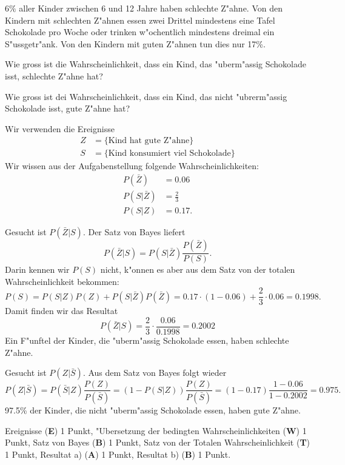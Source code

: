$6\%$ aller Kinder zwischen 6 und 12 Jahre haben schlechte Z"ahne.
Von den Kindern mit schlechten Z"ahnen essen zwei Drittel mindestens eine
Tafel Schokolade pro Woche oder trinken w"ochentlich mindestens
dreimal ein S"ussgetr"ank. Von den Kindern mit guten Z"ahnen tun dies
nur 17\%.
\begin{teilaufgaben}
\item Wie gross ist die Wahrscheinlichkeit, dass ein Kind, das "uberm"assig
Schokolade isst, schlechte Z"ahne hat?
\item Wie gross ist dei Wahrscheinlichkeit, dass ein Kind, das nicht
"ubrerm"assig Schokolade isst, gute Z"ahne hat?
\end{teilaufgaben}

\begin{loesung}
Wir verwenden die Ereignisse
\begin{align*}
Z&=\{\text{Kind hat gute Z"ahne}\}
\\
S&=\{\text{Kind konsumiert viel Schokolade}\}
\end{align*}
Wir wissen aus der Aufgabenstellung folgende Wahrscheinlichkeiten:
\begin{align*}
P(\bar Z)&=0.06\\
P(S|\bar Z)&=\frac23\\
P(S|Z)&=0.17.
\end{align*}
\begin{teilaufgaben}
\item Gesucht ist $P(\bar Z|S)$. Der Satz von Bayes liefert
\[
P(\bar Z|S)= P(S|\bar Z) \frac{P(\bar Z)}{P(S)}.
\]
Darin kennen wir $P(S)$ nicht, k"onnen es aber aus dem Satz von der
totalen Wahrscheinlichkeit bekommen:
\[
P(S)=P(S|Z)P(Z)+P(S|\bar Z)P(\bar Z)
=0.17\cdot (1-0.06)+\frac23\cdot 0.06=0.1998.
\]
Damit finden wir das Resultat
\[
P(\bar Z|S)=\frac23\cdot \frac{0.06}{0.1998}=0.2002
\]
Ein F"unftel der Kinder, die "uberm"assig Schokolade essen, haben
schlechte Z"ahne.
\item Gesucht ist $P(Z|\bar S)$. Aus dem Satz von Bayes folgt wieder
\[
P(Z|\bar S)=P(\bar S|Z)\frac{P(Z)}{P(\bar S)}=(1-P(S|Z))\frac{P(Z)}{P(\bar S)}
=(1-0.17)\frac{1-0.06}{1-0.2002}=0.975.
\]
97.5\% der Kinder, die nicht "uberm"assig Schokolade essen, haben gute 
Z"ahne.
\qedhere
\end{teilaufgaben}
\end{loesung}

\begin{bewertung}
Ereignisse ({\bf E}) 1 Punkt,
"Ubersetzung der bedingten Wahrscheinlichkeiten ({\bf W}) 1 Punkt,
Satz von Bayes ({\bf B}) 1 Punkt,
Satz von der Totalen Wahrscheinlichkeit ({\bf T}) 1 Punkt,
Resultat a) ({\bf A}) 1 Punkt,
Resultat b) ({\bf B}) 1 Punkt.
\end{bewertung}



